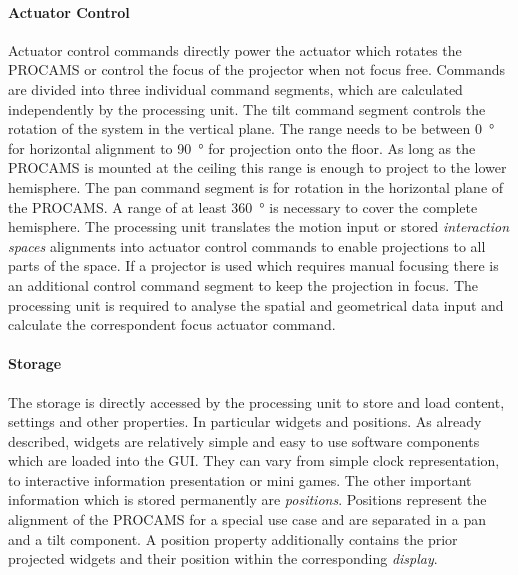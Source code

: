 \paragraph{Actuator Control}
Actuator control commands directly power the actuator which rotates the \ac{PROCAMS} or control the focus of the projector when not focus free. Commands are divided into three individual command segments, which are calculated independently by the processing unit. The tilt command segment controls the rotation of the system in the vertical plane. The range needs to be between \SI{0}{\degree} for horizontal alignment to \SI{90}{\degree} for projection onto the floor. As long as the \ac{PROCAMS} is mounted at the ceiling this range is enough to project to the lower hemisphere. The pan command segment is for rotation in the horizontal plane of the \ac{PROCAMS}. A range of at least \SI{360}{\degree} is necessary to cover the complete hemisphere. 
The processing unit translates the motion input or stored \emph{interaction spaces} alignments into actuator control commands to enable projections to all parts of the space.
If a projector is used which requires manual focusing there is an additional control command segment to keep the projection in focus. The processing unit is required to analyse the spatial and geometrical data input and calculate the correspondent focus actuator command.

\paragraph{Storage}
The storage is directly accessed by the processing unit to store and load content, settings and other properties. In particular widgets and  positions. As already described, widgets are relatively simple and easy to use software components which are loaded into the \ac{GUI}. They can vary from simple clock representation, to interactive information presentation or mini games. The other important information which is stored permanently are \emph{positions}. Positions represent the alignment of the \ac{PROCAMS} for a special use case and are separated in a pan and a tilt component. A position property additionally contains the prior projected widgets and their position within the corresponding \emph{display}.